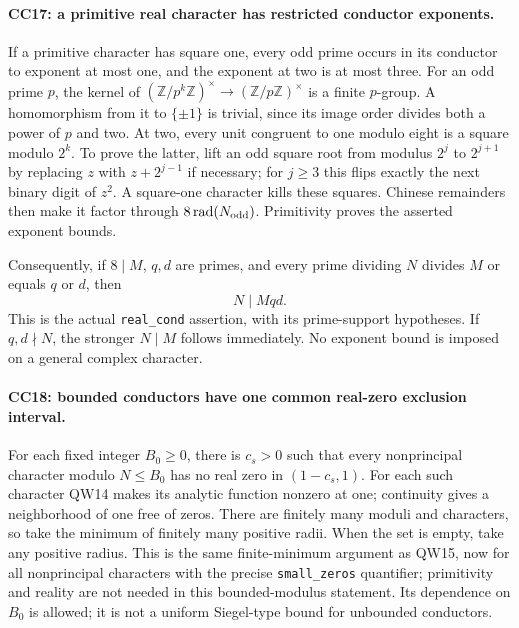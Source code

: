 \paragraph{CC17: a primitive real character has restricted conductor exponents.}
If a primitive character has square one, every odd prime
occurs in its conductor to exponent at most one, and the
exponent at two is at most three.
For an odd prime $p$, the kernel of
$(\mathbb Z/p^k\mathbb Z)^\times\to(\mathbb Z/p\mathbb Z)^\times$
is a finite $p$-group. A homomorphism from it to $\{\pm1\}$
is trivial, since its image order divides both a power of $p$
and two. At two, every unit congruent to one modulo eight
is a square modulo $2^k$. To prove the latter, lift an odd
square root from modulus $2^j$ to $2^{j+1}$ by replacing
$z$ with $z+2^{j-1}$ if necessary; for $j\ge3$ this flips
exactly the next binary digit of $z^2$.
A square-one character kills these squares. Chinese remainders
then make it factor through $8\operatorname{rad}(N_{\rm odd})$.
Primitivity proves the asserted exponent bounds.

Consequently, if $8\mid M$, $q,d$ are primes, and every prime
dividing $N$ divides $M$ or equals $q$ or $d$, then
\[
                                  N\mid Mqd.             \tag{CC.28}
\]
This is the actual \texttt{real\_cond} assertion, with its
prime-support hypotheses. If $q,d\nmid N$, the stronger
$N\mid M$ follows immediately. No exponent bound is imposed
on a general complex character.

\paragraph{CC18: bounded conductors have one common real-zero exclusion interval.}
For each fixed integer $B_0\ge0$, there is $c_s>0$ such that
every nonprincipal character modulo $N\le B_0$
has no real zero in $(1-c_s,1)$.
For each such character QW14 makes its analytic function
nonzero at one; continuity gives a neighborhood of one free
of zeros. There are finitely many moduli and characters, so
take the minimum of finitely many positive radii. When the
set is empty, take any positive radius. This is the same
finite-minimum argument as QW15, now for all nonprincipal
characters with the precise \texttt{small\_zeros} quantifier;
primitivity and reality are not needed in this bounded-modulus
statement.
Its dependence on $B_0$ is allowed; it is not a uniform
Siegel-type bound for unbounded conductors.

